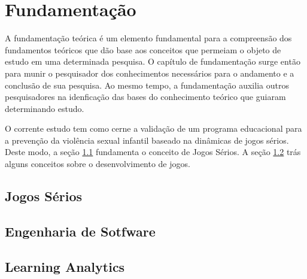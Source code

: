 \chapter{Fundamentação}\label{ch:Fundamentacao}

A fundamentação teórica é um elemento fundamental para a compreensão dos fundamentos teóricos que dão base aos conceitos que permeiam o objeto de estudo em uma determinada pesquisa. O capítulo de fundamentação surge então para munir o pesquisador dos conhecimentos necessários para o andamento e a conclusão de sua pesquisa. Ao mesmo tempo, a fundamentação auxilia outros pesquisadores na idenficação das bases do conhecimento teórico que guiaram determinando estudo. 

O corrente estudo tem como cerne a validação de um programa educacional para a prevenção da violência sexual infantil baseado na dinâmicas de jogos sérios. Deste modo, a seção \ref{sec:JogosSerios} fundamenta o conceito de Jogos Sérios. A seção \ref{sec:Engenharia} trás alguns conceitos sobre o desenvolvimento de jogos.

\section{Jogos Sérios}\label{sec:JogosSerios}

\section{Engenharia de Sotfware}\label{sec:Engenharia}

\section{Learning Analytics}\label{sec:LA}

